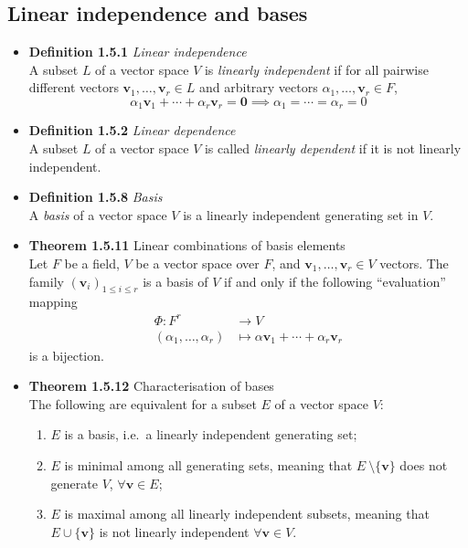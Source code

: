 \documentclass[11pt,a4paper]{article}
\begin{document}
\subsection{Linear independence and bases}

\begin{itemize}

    \item \textbf{Definition 1.5.1} \emph{Linear independence} \\
        A subset $L$ of a vector space $V$ is \emph{linearly independent}
        if for all pairwise different vectors
        $\textbf{v}_1, \ldots, \textbf{v}_r \in L$ and arbitrary vectors
        $\alpha_1, \ldots, \textbf{v}_r \in F$,
        \[
            \alpha_1 \textbf{v}_1 + \cdots + \alpha_r \textbf{v}_r = \textbf{0} \implies
            \alpha_1 = \cdots = \alpha_r = 0
        \]

    \item \textbf{Definition 1.5.2} \emph{Linear dependence} \\
        A subset $L$ of a vector space $V$ is called \emph{linearly dependent} if it is not
        linearly independent.

    \item \textbf{Definition 1.5.8} \emph{Basis} \\
        A \emph{basis} of a vector space $V$ is a linearly independent generating set in $V$.

    \item \textbf{Theorem 1.5.11} Linear combinations of basis elements \\
        Let $F$ be a field, $V$ be a vector space over $F$, and
        $\textbf{v}_1, \ldots, \textbf{v}_r \in V$ vectors.
        The family ${(\textbf{v}_i)}_{1 \leq i \leq r}$ is a basis of $V$ if and only if the
        following ``evaluation'' mapping
        \begin{align*}{}
            \Phi : F^r                    & \to V \\
            (\alpha_1, \ldots, \alpha_r)  & \mapsto \alpha\textbf{v}_1 +
            \cdots + \alpha_r\textbf{v}_r
        \end{align*}
        is a bijection.

    \item \textbf{Theorem 1.5.12} Characterisation of bases \\
        The following are equivalent for a subset $E$ of a vector space $V$:
        \begin{enumerate}
            \item $E$ is a basis, i.e.\ a linearly independent generating set;
            \item $E$ is minimal among all generating sets,
                meaning that $E \ \setminus \{\textbf{v}\}$ does not generate $V$,
                $\forall \textbf{v} \in E$;
            \item $E$ is maximal among all linearly independent subsets,
                meaning that $E \cup \{\textbf{v}\}$ is not linearly independent
                $\forall \textbf{v} \in V$.
        \end{enumerate}


\end{itemize}
\end{document}
